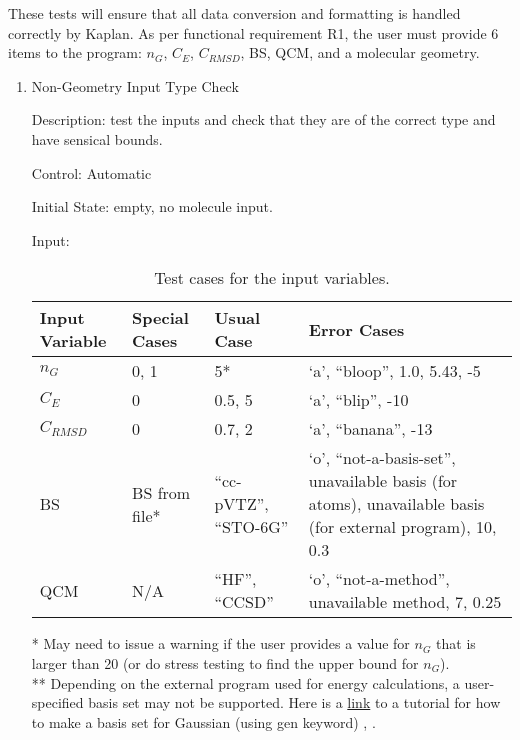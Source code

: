 \documentclass[12pt, titlepage]{article}
\newcommand{\progname}{Kaplan} %
\begin{document}
These tests will ensure that all data conversion and formatting is handled 
correctly by \progname{}. As per functional requirement R1, the user must 
provide 6 items to the program: $n_G$, $C_E$, $C_{RMSD}$, BS, QCM, and a 
molecular geometry. 

\begin{enumerate}

\item Non-Geometry Input Type Check

Description: test the inputs and check that they are of the correct type and 
have sensical bounds.

Control: Automatic

Initial State: empty, no molecule input.

Input:
\begin{table}[H]
	\begin{tabular}{p{3cm}p{3cm}p{2.5cm}p{4cm}}
		\toprule
		Input Variable & Special Cases & Usual Case & Error Cases \\
		\midrule
		$n_G$    & 0, 1        & 5*          & `a', ``bloop'', 1.0, 5.43, -5 \\
		$C_E$    & 0          & 0.5, 5        & `a', ``blip'', -10 \\
		$C_{RMSD}$ & 0        & 0.7, 2       & `a', ``banana'', -13 \\
		BS       & BS from file*  & ``cc-pVTZ'', ``STO-6G'' & 
		`o', ``not-a-basis-set'', unavailable basis (for atoms), unavailable 
		basis (for external program), 10, 0.3 \\
		QCM      & N/A           & ``HF'', ``CCSD'' & `o', ``not-a-method'', 
		unavailable method, 7, 
		0.25 
		\\
		\bottomrule
	\end{tabular}
\label{table-inputs}
\caption{Test cases for the input variables.}
\end{table}

* May need to issue a warning if the user provides a value for $n_G$ that is 
larger than 20 (or do stress testing to find the upper bound for
$n_G$). \\
** Depending on the external program used for energy calculations, a 
user-specified basis set may not be supported. Here is a 
\href{https://joaquinbarroso.com/2011/11/02/gen-keyword-gaussian/}{link} to a 
tutorial for how to make a basis set for Gaussian (using gen keyword) 
\cite{link-gen-basis}, \cite{g16}.


\end{enumerate}
\end{document}
